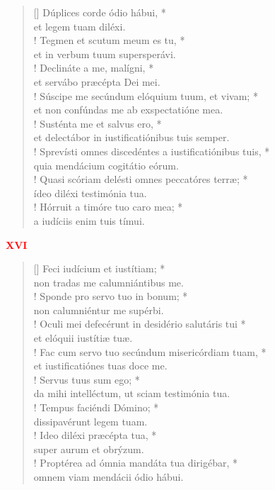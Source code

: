 \begin{verse}[\versewidth]
Dúplices corde ódio hábui, *\\
et legem tuam diléxi.\\!
\vin Tegmen et scutum meum es tu, *\\
\vin et in verbum tuum supersperávi.\\!
Declináte a me, malígni, *\\
et servábo præcépta Dei mei.\\!
\vin Súscipe me secúndum elóquium tuum, et vivam; *\\
\vin et non confúndas me ab exspectatióne mea.\\!
Susténta me et salvus ero, *\\
et delectábor in iustificatiónibus tuis semper.\\!
\vin Sprevísti omnes discedéntes a iustificatiónibus tuis, *\\
\vin quia mendácium cogitátio eórum.\\!
Quasi scóriam delésti omnes peccatóres terræ; *\\
ídeo diléxi testimónia tua.\\!
\vin Hórruit a timóre tuo caro mea; *\\
\vin a iudíciis enim tuis tímui.\\
\end{verse}
\begin{center}
\textcolor{red}{\bf XVI}\\
\end{center}
\begin{verse}[\versewidth]
Feci iudícium et iustítiam; *\\
non tradas me calumniántibus me.\\!
\vin Sponde pro servo tuo in bonum; *\\
\vin non calumniéntur me supérbi.\\!
Oculi mei defecérunt in desidério salutáris tui *\\
et elóquii iustítiæ tuæ.\\!
\vin Fac cum servo tuo secúndum misericórdiam tuam, *\\
\vin et iustificatiónes tuas doce me.\\!
Servus tuus sum ego; *\\
da mihi intelléctum, ut sciam testimónia tua.\\!
\vin Tempus faciéndi Dómino; *\\
\vin dissipavérunt legem tuam.\\!
Ideo diléxi præcépta tua, *\\
super aurum et obrýzum.\\!
\vin Proptérea ad ómnia mandáta tua dirigébar, *\\
\vin omnem viam mendácii ódio hábui.\\
\end{verse}
\vspace{1cm}


